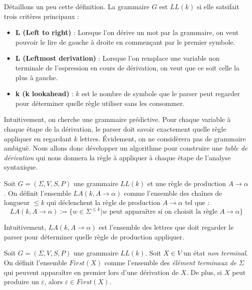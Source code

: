 \begin{remark}
    Détaillons un peu cette définition. La grammaire $G$ est $LL(k)$ si elle satsifait trois critères 
    principaux : 
    \begin{itemize}
        \item \textbf{L (Left to right)} : Lorsque l'on dérive un mot par la grammaire, on veut pouvoir 
        le lire de gauche à droite en commençant par le premier symbole. 
        \item \textbf{L (Leftmost derivation)} : Lorsque l'on remplace une variable non terminale 
        de l'espression en cours de dérivation, on veut que ce soit celle la plus à gauche. 
        \item \textbf{k (k lookahead)} : $k$ est le nombre de symbole que le parser peut regarder 
        pour déterminer quelle règle utiliser sans les consommer. 
    \end{itemize}
\end{remark}

Intuitivement, on cherche une grammaire prédictive. Pour chaque variable à chaque étape de la dérivation, 
le parser doit savoir exactement quelle règle appliquer en regardant $k$ lettres. Évidement, on ne considèrera 
pas de grammaire ambiguë. Nous allons donc développer un algorithme pour construire une \emph{table de dérivation} 
qui nous donnera la règle à appliquer à chaque étape de l'analyse syntaxique. 

\begin{definition}[$k$ - Lookadhead]
    Soit $G = ( \Sigma, V, S, P)$ une grammaire $LL(k)$ et une règle de production $A \rightarrow \alpha$. On définit 
    l'ensemble $LA(k, A \rightarrow \alpha)$ comme l'ensemble des chaînes de longueur $ \leqslant k$ qui déclenchent 
    la règle de production $A \rightarrow \alpha$ tel que : 
        \[ \boxed{LA(k, A \rightarrow \alpha) := \{w \in \Sigma^{ \leqslant k} | w \text{ peut apparaître si on choisit la règle } A \rightarrow \alpha\}} \] 
\end{definition}

Intuitivement, $LA(k, A \rightarrow \alpha)$ est l'ensemble des lettres que doit regarder le parser pour déterminer 
quelle règle de production appliquer. 

\begin{definition}
    Soit $G = ( \Sigma, V, S, P)$ une grammaire $LL(k)$. 
    Soit $X \in V$ un état \emph{non terminal}. On définit l'ensemble $First(X)$ comme l'ensemble 
    des \emph{élément terminaux de $ \Sigma$} qui peuvent apparaître en premier lors d'une dérivation de $X$. 
    De plus, si $X$ peut produire un $ \varepsilon$, alors $ \varepsilon \in  First(X)$. 
\end{definition}

